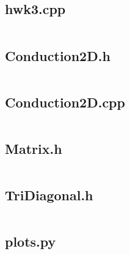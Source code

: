 \documentclass{article}
\begin{document}
\subsection*{hwk3.cpp}
\inputminted[fontsize=\small]{c++}{../hwk3.cpp}

\subsection*{Conduction2D.h}
\inputminted[fontsize=\small]{c++}{../Conduction2D.h}

\subsection*{Conduction2D.cpp}
\inputminted[fontsize=\small]{c++}{../Conduction2D.cpp}

\subsection*{Matrix.h}
\inputminted[fontsize=\small]{c++}{../Matrix.h}

\subsection*{TriDiagonal.h}
\inputminted[fontsize=\small]{c++}{../TriDiagonal.h}

\subsection*{plots.py}
\inputminted[fontsize=\small]{python}{../plots.py}
\end{document}
